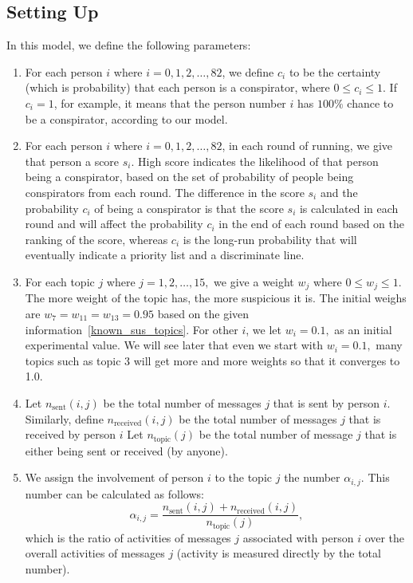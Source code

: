 \documentclass{icmmcm}
\begin{document}
\subsection{Setting Up}
In this model, we define the following parameters:
\begin{enumerate}
\item  For each person $i$ where $i=0,1,2,\ldots, 82$, 
we define $c_i$ to be the certainty (which is probability)
that each person is a conspirator,
where $0\leq c_i \leq 1.$ 
If $c_i=1$, for example, it means that the person
number $i$ has $100\%$ chance to be
a conspirator, according to our model. 

\item  For each person $i$ where $i=0,1,2,\ldots, 82$, in each round of running,
we give that person a score $s_i$. High score indicates
the likelihood of that person being a conspirator, 
based on the set
of probability of people being conspirators from each round.
The difference in the score $s_i$ and the probability $c_i$ of
being a conspirator is that the score $s_i$ is calculated in each round
and will affect the probability $c_i$ in the end of each round
based on the ranking of the score, whereas $c_i$ is the long-run
probability that will eventually indicate a priority list and
a discriminate line.

\item For each topic $j$ where $j=1,2,\ldots,15,$
we give a weight $w_j$ where $0\leq w_j\leq 1.$
The more weight of the topic has, the more suspicious it is.
The initial weighs are $w_7 = w_{11} = w_{13} = 0.95$ based
on the  given information~\eqref{known_sus_topics}.
For other $i$, we let $w_i = 0.1,$ as an initial 
experimental value. We will see later that even
we start with $w_i = 0.1,$ many topics such as 
topic 3 will get more and more weights so that
it converges to 1.0.

\item Let $n_{\text{sent}}(i,j)$ be the total 
number of messages $j$ that is sent by person $i$.
Similarly, define $n_{\text{received}}(i,j)$ be the total 
number of messages $j$ that is received by person $i$
Let $n_{\text{topic}}(j)$ be the total number of message $j$
that is either being sent or received (by anyone).

\item  We assign the involvement of person $i$ to the topic $j$ the number
$\alpha_{i,j}.$ This number can be calculated as follows:
\[\alpha_{i,j} = \frac{n_{\text{sent}}(i,j) + n_{\text{received}}(i,j)}
{n_{\text{topic}}(j)},\]
which is the ratio of activities of messages $j$ associated
with person $i$ over the overall activities of messages $j$
(activity is measured directly by the total number).
\end{enumerate}
\end{document}
